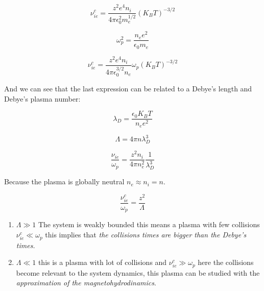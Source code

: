 \documentclass[spanish,notitlepage,letterpaper,11pt]{article} %
\numberwithin{equation}{subsection}
\begin{document}
        \begin{equation}
            \nu_{ie}^c = \frac{z^2e^4n_i}{4\pi\epsilon_0^2m_e^{1/2}}(K_BT)^{-3/2}
        \end{equation}

        \begin{equation}
            \omega_p^2 = \frac{n_ee^2}{\epsilon_0m_e}
        \end{equation}


        \begin{equation}
            \nu_{ie}^c = \frac{z^2e^4n_i}{4\pi\epsilon_0^{3/2}n_e}\omega_p(K_BT)^{-3/2}
        \end{equation}

        And we can see that the last expression can be related to a Debye's length and Debye's plasma number: 

        \begin{equation}
            \lambda_D = \frac{\epsilon_0K_BT}{n_ee^2}
        \end{equation}

        \begin{equation}
            \Lambda = 4\pi n \lambda_D^3
        \end{equation}

        \begin{equation}
            \frac{\nu_{ie}}{\omega_p} = \frac{z^2n_i}{4\pi n_e^2}\frac{1}{\lambda_D^3}
        \end{equation}

        Because the plasma is globally neutral $n_e \approx n_i = n$.
        
        \begin{equation}\label{eq:frequencies}
            \frac{\nu_{ie}^c}{\omega_p} = \frac{z^2}{\Lambda}
        \end{equation}

        \begin{enumerate}
            \item $\Lambda \gg 1$ The system is weakly bounded this means a plasma with few collisions $\nu^c_{ie} \ll \omega_p$ this implies that \textit{the collisions times are bigger than the Debye's times.}

            \item $\Lambda \ll 1$ this is a plasma with lot of collisions  and $\nu^c_{ie} \gg \omega_p$ here the collisions become relevant to the system dynamics, this plasma can be studied with the \textit{approximation of the magnetohydrodinamics}.
        \end{enumerate}
\end{document}

